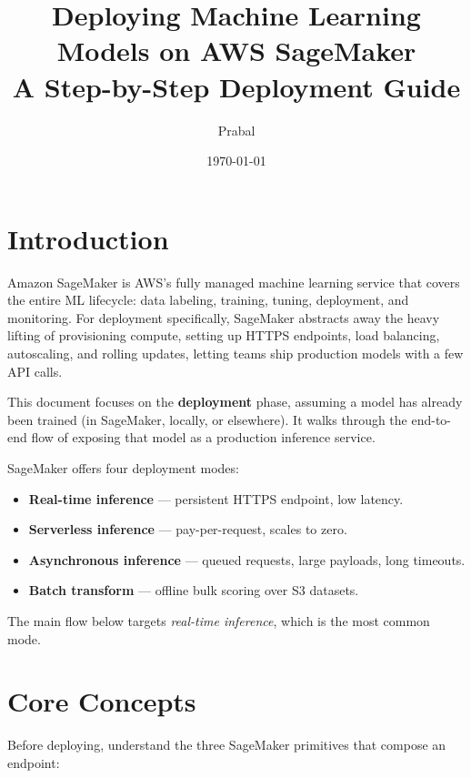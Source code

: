 \documentclass[11pt,a4paper]{article}
\title{\textbf{Deploying Machine Learning Models on AWS SageMaker}\\
\large A Step-by-Step Deployment Guide}
\author{Prabal}
\date{\today}
\begin{document}
\maketitle
\tableofcontents
\newpage

\section{Introduction}

Amazon SageMaker is AWS's fully managed machine learning service that covers the
entire ML lifecycle: data labeling, training, tuning, deployment, and monitoring.
For deployment specifically, SageMaker abstracts away the heavy lifting of
provisioning compute, setting up HTTPS endpoints, load balancing, autoscaling,
and rolling updates, letting teams ship production models with a few API calls.

This document focuses on the \textbf{deployment} phase, assuming a model has
already been trained (in SageMaker, locally, or elsewhere). It walks through the
end-to-end flow of exposing that model as a production inference service.

\begin{notebox}
SageMaker offers four deployment modes:
\begin{itemize}[leftmargin=*,nosep]
    \item \textbf{Real-time inference} --- persistent HTTPS endpoint, low latency.
    \item \textbf{Serverless inference} --- pay-per-request, scales to zero.
    \item \textbf{Asynchronous inference} --- queued requests, large payloads, long timeouts.
    \item \textbf{Batch transform} --- offline bulk scoring over S3 datasets.
\end{itemize}
The main flow below targets \emph{real-time inference}, which is the most common mode.
\end{notebox}

\section{Core Concepts}

Before deploying, understand the three SageMaker primitives that compose an endpoint:
\end{document}

